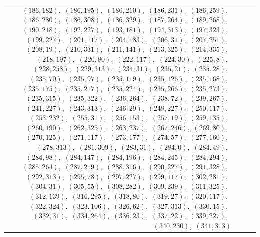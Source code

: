 \documentclass[11pt]{article}
\begin{document}
\begin{longtable}{@{}rrl>{\raggedright\arraybackslash}p{}@{}}
$(186,182)$,\allowbreak\ $(186,195)$,\allowbreak\ $(186,210)$,\allowbreak\ $(186,231)$,\allowbreak\ $(186,259)$,\allowbreak\ $(186,280)$,\allowbreak\ $(186,308)$,\allowbreak\ $(186,329)$,\allowbreak\ $(187,264)$,\allowbreak\ $(189,268)$,\allowbreak\ $(190,218)$,\allowbreak\ $(192,227)$,\allowbreak\ $(193,181)$,\allowbreak\ $(194,313)$,\allowbreak\ $(197,323)$,\allowbreak\ $(199,227)$,\allowbreak\ $(201,117)$,\allowbreak\ $(204,183)$,\allowbreak\ $(206,31)$,\allowbreak\ $(207,251)$,\allowbreak\ $(208,19)$,\allowbreak\ $(210,331)$,\allowbreak\ $(211,141)$,\allowbreak\ $(213,325)$,\allowbreak\ $(214,335)$,\allowbreak\ $(218,197)$,\allowbreak\ $(220,80)$,\allowbreak\ $(222,117)$,\allowbreak\ $(224,30)$,\allowbreak\ $(225,8)$,\allowbreak\ $(228,258)$,\allowbreak\ $(229,313)$,\allowbreak\ $(234,31)$,\allowbreak\ $(235,21)$,\allowbreak\ $(235,28)$,\allowbreak\ $(235,70)$,\allowbreak\ $(235,97)$,\allowbreak\ $(235,119)$,\allowbreak\ $(235,126)$,\allowbreak\ $(235,168)$,\allowbreak\ $(235,175)$,\allowbreak\ $(235,217)$,\allowbreak\ $(235,224)$,\allowbreak\ $(235,266)$,\allowbreak\ $(235,273)$,\allowbreak\ $(235,315)$,\allowbreak\ $(235,322)$,\allowbreak\ $(236,264)$,\allowbreak\ $(238,72)$,\allowbreak\ $(239,267)$,\allowbreak\ $(241,227)$,\allowbreak\ $(243,313)$,\allowbreak\ $(246,29)$,\allowbreak\ $(248,227)$,\allowbreak\ $(250,117)$,\allowbreak\ $(253,232)$,\allowbreak\ $(255,31)$,\allowbreak\ $(256,153)$,\allowbreak\ $(257,19)$,\allowbreak\ $(259,135)$,\allowbreak\ $(260,190)$,\allowbreak\ $(262,325)$,\allowbreak\ $(263,237)$,\allowbreak\ $(267,246)$,\allowbreak\ $(269,80)$,\allowbreak\ $(270,125)$,\allowbreak\ $(271,117)$,\allowbreak\ $(273,177)$,\allowbreak\ $(274,57)$,\allowbreak\ $(277,160)$,\allowbreak\ $(278,313)$,\allowbreak\ $(281,309)$,\allowbreak\ $(283,31)$,\allowbreak\ $(284,0)$,\allowbreak\ $(284,49)$,\allowbreak\ $(284,98)$,\allowbreak\ $(284,147)$,\allowbreak\ $(284,196)$,\allowbreak\ $(284,245)$,\allowbreak\ $(284,294)$,\allowbreak\ $(285,264)$,\allowbreak\ $(287,219)$,\allowbreak\ $(288,316)$,\allowbreak\ $(290,227)$,\allowbreak\ $(291,328)$,\allowbreak\ $(292,313)$,\allowbreak\ $(295,78)$,\allowbreak\ $(297,227)$,\allowbreak\ $(299,117)$,\allowbreak\ $(302,281)$,\allowbreak\ $(304,31)$,\allowbreak\ $(305,55)$,\allowbreak\ $(308,282)$,\allowbreak\ $(309,239)$,\allowbreak\ $(311,325)$,\allowbreak\ $(312,139)$,\allowbreak\ $(316,295)$,\allowbreak\ $(318,80)$,\allowbreak\ $(319,27)$,\allowbreak\ $(320,117)$,\allowbreak\ $(322,324)$,\allowbreak\ $(323,106)$,\allowbreak\ $(326,62)$,\allowbreak\ $(327,313)$,\allowbreak\ $(330,15)$,\allowbreak\ $(332,31)$,\allowbreak\ $(334,264)$,\allowbreak\ $(336,23)$,\allowbreak\ $(337,22)$,\allowbreak\ $(339,227)$,\allowbreak\ $(340,230)$,\allowbreak\ $(341,313)$\\

\end{longtable}
\end{document}
